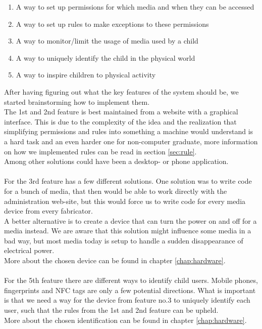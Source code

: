 \begin{enumerate}
	\item A way to set up permissions for which media and when they can be accessed
	\item A way to set up rules to make exceptions to these permissions
	\item A way to monitor/limit the usage of media used by a child
	\item A way to uniquely identify the child in the physical world
	\item A way to inspire children to physical activity
\end{enumerate}

After having figuring out what the key features of the system should be, we started brainstorming how to implement them.\\
The 1st and 2nd feature is best maintained from a website with a graphical interface. This is due to the complexity of the idea and the realization that simplifying permissions and rules into something a machine would understand is a hard task and an even harder one for non-computer graduate, more information on how we implemented rules can be read in section \vref{sec:rule}.\\
Among other solutions could have been a desktop- or phone application.\\
\\
For the 3rd feature has a few different solutions. One solution was to write code for a bunch of media, that then would be able to work directly with the administration web-site, but this would force us to write code for every media device from every fabricator.\\
A better alternative is to create a device that can turn the power on and off for a media instead. We are aware that this solution might influence some media in a bad way, but most media today is setup to handle a sudden disappearance of electrical power.\\
More about the chosen device can be found in chapter \vref{chap:hardware}.\\
\\
For the 5th feature there are different ways to identify child users. Mobile phones, fingerprints and NFC tags are only a few potential directions. What is important is that we need a way for the device from feature no.3 to uniquely identify each user, such that the rules from the 1st and 2nd feature can be upheld.\\
More about the chosen identification can be found in chapter \vref{chap:hardware}.\\
